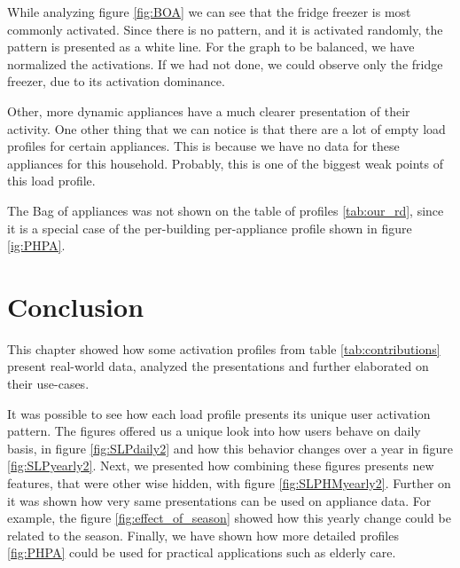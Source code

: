 While analyzing figure \ref{fig:BOA} we can see that the fridge freezer is most commonly activated.
Since there is no pattern, and it is activated randomly, the pattern is presented as a white line.
For the graph to be balanced, we have normalized the activations.
If we had not done, we could observe only the fridge freezer, due to its activation dominance. 

Other, more dynamic appliances have a much clearer presentation of their activity. 
One other thing that we can notice is that there are a lot of empty load profiles for certain appliances.
This is because we have no data for these appliances for this household.
Probably, this is one of the biggest weak points of this load profile.

The Bag of appliances was not shown on the table of profiles \ref{tab:our_rd},
since it is a special case of the per-building per-appliance profile shown in figure \ref{ig:PHPA}.

\section{Conclusion}

This chapter showed how some activation profiles from table \ref{tab:contributions} present real-world data, analyzed the presentations and further elaborated on their use-cases.

It was possible to see how each load profile presents its unique user activation pattern. 
The figures offered us a unique look into how users behave on daily basis, in figure \ref{fig:SLPdaily2} and how this behavior changes over a year in figure \ref{fig:SLPyearly2}.
Next, we presented how combining these figures presents new features, that were other wise hidden, with figure \ref{fig:SLPHMyearly2}.
Further on it was shown how very same presentations can be used on appliance data.
For example, the figure \ref{fig:effect_of_season} showed how this yearly change could be related to the season.
Finally, we have shown how more detailed profiles \ref{fig:PHPA} could be used for practical applications such as elderly care. 